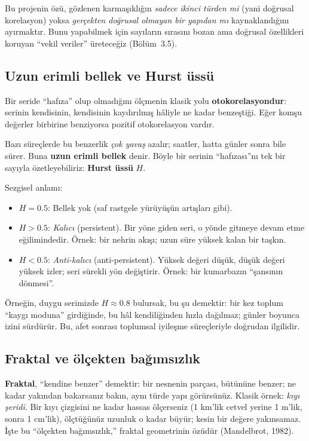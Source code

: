 \documentclass[11pt,a4paper]{article}
\begin{document}
Bu projenin özü, gözlenen karmaşıklığın \emph{sadece ikinci türden mi} (yani
doğrusal korelasyon) yoksa \emph{gerçekten doğrusal olmayan bir yapıdan mı}
kaynaklandığını ayırmaktır. Bunu yapabilmek için sayıların sırasını bozan ama
doğrusal özellikleri koruyan ``vekil veriler'' üreteceğiz (Bölüm~3.5).

\subsection{Uzun erimli bellek ve Hurst üssü}

Bir seride ``hafıza'' olup olmadığını ölçmenin klasik yolu
\textbf{otokorelasyondur}: serinin kendisinin, kendisinin kaydırılmış hâliyle
ne kadar benzeştiği. Eğer komşu değerler birbirine benziyorsa pozitif
otokorelasyon vardır.

Bazı süreçlerde bu benzerlik \emph{çok yavaş} azalır; saatler, hatta günler
sonra bile sürer. Buna \textbf{uzun erimli bellek} denir. Böyle bir serinin
``hafızası''nı tek bir sayıyla özetleyebiliriz: \textbf{Hurst üssü} $H$.

Sezgisel anlamı:
\begin{itemize}[leftmargin=1.4em]
  \item $H = 0.5$: Bellek yok (saf rastgele yürüyüşün artışları gibi).
  \item $H > 0.5$: \emph{Kalıcı} (persistent). Bir yöne giden seri, o yönde
        gitmeye devam etme eğilimindedir. Örnek: bir nehrin akışı; uzun süre
        yüksek kalan bir taşkın.
  \item $H < 0.5$: \emph{Anti-kalıcı} (anti-persistent). Yüksek değeri düşük,
        düşük değeri yüksek izler; seri sürekli yön değiştirir. Örnek: bir
        kumarbazın ``şansının dönmesi''.
\end{itemize}

Örneğin, duygu serimizde $H \approx 0.8$ bulursak, bu şu demektir: bir kez
toplum ``kaygı moduna'' girdiğinde, bu hâl kendiliğinden hızla dağılmaz;
günler boyunca izini sürdürür. Bu, afet sonrası toplumsal iyileşme
süreçleriyle doğrudan ilgilidir.

\subsection{Fraktal ve ölçekten bağımsızlık}

\textbf{Fraktal}, ``kendine benzer'' demektir: bir nesnenin parçası, bütününe
benzer; ne kadar yakından bakarsanız bakın, aynı türde yapı görürsünüz.
Klasik örnek: \emph{kıyı şeridi}. Bir kıyı çizgisini ne kadar hassas ölçerseniz
(1 km'lik cetvel yerine 1 m'lik, sonra 1 cm'lik), ölçtüğünüz uzunluk o kadar
büyür; kesin bir değere yakınsamaz. İşte bu ``ölçekten bağımsızlık,'' fraktal
geometrinin özüdür (Mandelbrot, 1982).
\end{document}
